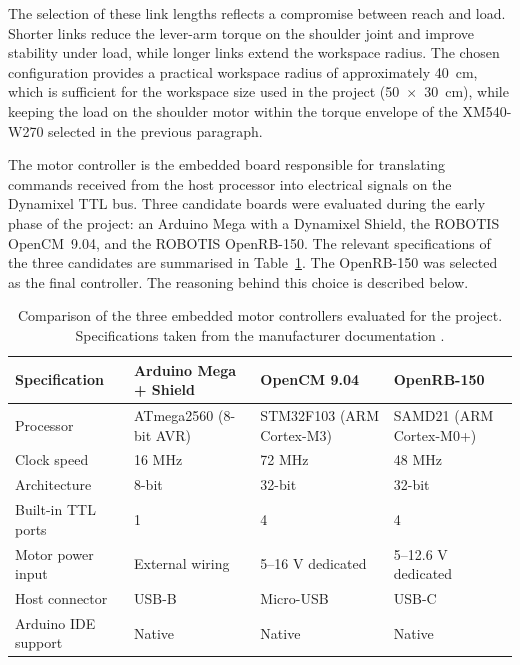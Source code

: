 The selection of these link lengths reflects a compromise between 
reach and load. Shorter links reduce the lever-arm torque on the 
shoulder joint and improve stability under load, while longer 
links extend the workspace radius. The chosen configuration 
provides a practical workspace radius of approximately 40~cm, 
which is sufficient for the workspace size used in the project 
(50~$\times$~30~cm), while keeping the load on the shoulder 
motor within the torque envelope of the XM540-W270 selected in 
the previous paragraph.


The motor controller is the embedded board responsible for 
translating commands received from the host processor into 
electrical signals on the Dynamixel TTL bus. Three candidate 
boards were evaluated during the early phase of the project: an 
Arduino Mega with a Dynamixel Shield, the ROBOTIS OpenCM~9.04, 
and the ROBOTIS OpenRB-150. The relevant specifications of the 
three candidates are summarised in Table~\ref{tab:controller_comparison}. 
The OpenRB-150 was selected as the final controller. The reasoning 
behind this choice is described below.

\begin{table}[H]
    \centering
    \renewcommand{\arraystretch}{1.3}
    \begin{tabular}{|p{3.3cm}|p{3.3cm}|p{3.3cm}|p{3.3cm}|}
        \hline
        \textbf{Specification} & \textbf{Arduino Mega + Shield} & 
        \textbf{OpenCM 9.04} & \textbf{OpenRB-150} \\
        \hline
        Processor & ATmega2560 (8-bit AVR) & STM32F103 (ARM Cortex-M3) & 
        SAMD21 (ARM Cortex-M0+) \\
        \hline
        Clock speed & 16 MHz & 72 MHz & 48 MHz \\
        \hline
        Architecture & 8-bit & 32-bit & 32-bit \\
        \hline
        Built-in TTL ports & 1 & 4 & 4 \\
        \hline
        Motor power input & External wiring & 5--16 V dedicated & 
        5--12.6 V dedicated \\
        \hline
        Host connector & USB-B & Micro-USB & USB-C \\
        \hline
        Arduino IDE support & Native & Native & Native \\
        \hline
    \end{tabular}
    \caption{Comparison of the three embedded motor controllers 
    evaluated for the project. Specifications taken from the 
    manufacturer documentation \cite{robotis_dynamixel}.}
    \label{tab:controller_comparison}
\end{table}

